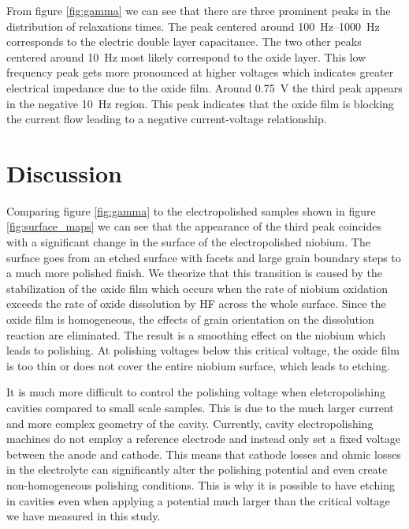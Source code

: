 \documentclass[11pt]{article}
\begin{document}
From figure \ref{fig:gamma} we can see that there are three prominent peaks in the distribution of relaxations times. The peak centered around \qtyrange{100}{1000}{\hertz} corresponds to the electric double layer capacitance. The two other peaks centered around \qty{10}{\hertz} most likely correspond to the oxide layer. This low frequency peak gets more pronounced at higher voltages which indicates greater electrical impedance due to the oxide film. Around \qty{0.75}{\volt} the third peak appears in the negative \qty{10}{\hertz} region. This peak indicates that the oxide film is blocking the current flow leading to a negative current-voltage relationship.



\section{Discussion}

Comparing figure \ref{fig:gamma} to the electropolished samples shown in figure \ref{fig:surface_maps} we can see that the appearance of the third peak coincides with a significant change in the surface of the electropolished niobium. The surface goes from an etched surface with facets and large grain boundary steps to a much more polished finish. We theorize that this transition is caused by the stabilization of the oxide film which occurs when the rate of niobium oxidation exceeds the rate of oxide dissolution by HF across the whole surface. Since the oxide film is homogeneous, the effects of grain orientation on the dissolution reaction are eliminated. The result is a smoothing effect on the niobium which leads to polishing. At polishing voltages below this critical voltage, the oxide film is too thin or does not cover the entire niobium surface, which leads to etching.

It is much more difficult to control the polishing voltage when eletcropolishing cavities compared to small scale samples. This is due to the much larger current and more complex geometry of the cavity. Currently, cavity electropolishing machines do not employ a reference electrode and instead only set a fixed voltage between the anode and cathode. This means that cathode losses and ohmic losses in the electrolyte can significantly alter the polishing potential and even create non-homogeneous polishing conditions. This is why it is possible to have etching in cavities even when applying a potential much larger than the critical voltage we have measured in this study.
\end{document}

